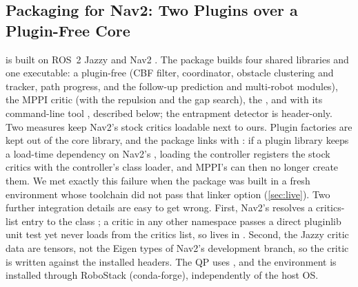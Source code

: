\subsection{Packaging for Nav2: Two Plugins over a Plugin-Free Core}\label{sec:impl}

\sname{} is built on ROS~2 Jazzy and Nav2 \citep{nav2}. The package  builds four shared libraries and one executable: a plugin-free  (CBF filter, coordinator, obstacle clustering and tracker, path progress, and the follow-up prediction and multi-robot modules), the  MPPI critic (with the repulsion and the gap search), the , and  with its command-line tool , described below; the entrapment detector is header-only. Two measures keep Nav2's stock critics loadable next to ours. Plugin factories are kept out of the core library, and the package links with : if a plugin library keeps a load-time dependency on Nav2's , loading the controller registers the stock critics with the controller's class loader, and MPPI's  can then no longer create them. We met exactly this failure when the package was built in a fresh environment whose toolchain did not pass that linker option (\cref{sec:live}). Two further integration details are easy to get wrong. First, Nav2's  resolves a critics-list entry  to the class ; a critic in any other namespace passes a direct pluginlib unit test yet never loads from the critics list, so  lives in . Second, the Jazzy critic data are  tensors, not the Eigen types of Nav2's development branch, so the critic is written against the installed headers. The QP uses  \citep{osqp}, and the environment is installed through RoboStack (conda-forge), independently of the host OS.

